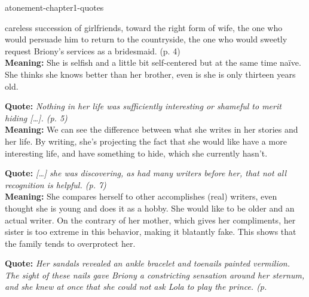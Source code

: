 \documentclass[preview]{standalone}
\begin{document}
\begin{snippet}{atonement-chapter1-quotes}
\begin{minipage}[r]{0.95\textwidth}
{        careless succession of girlfriends, toward the right form
        of wife, the one who would persuade him to return to the
        countryside, the one who would sweetly request Briony's
        services as a bridesmaid. (p. 4)
    }
    \\
    \textbf{Meaning:} She is selfish and a little bit self-centered but at the same time naïve.
    She thinks she knows better than her brother, even is she is only thirteen years old.
\end{minipage}
\hr
\begin{minipage}[l]{0.05\textwidth}
\end{minipage}
\begin{minipage}[r]{0.95\textwidth}
    \textbf{Quote:} \textit{
        Nothing in her life was sufficiently interesting or
        shameful to merit hiding […]. (p. 5)
    }
    \\
    \textbf{Meaning:} We can see the difference between what she writes in her stories and her life.
    By writing, she's projecting the fact that she would like have a more interesting life,
    and have something to hide, which she currently hasn't.
\end{minipage}
\hr
\begin{minipage}[l]{0.05\textwidth}
\end{minipage}
\begin{minipage}[r]{0.95\textwidth}
    \textbf{Quote:} \textit{
        […] she was discovering, as had many writers before her,
        that not all recognition is helpful. (p. 7)
    }
    \\
    \textbf{Meaning:} She compares herself to other accomplishes (real) writers, even thought she is
    young and does it as a hobby. She would like to be older and an actual writer.
    On the contrary of her mother, which gives her compliments, her sister is too extreme
    in this behavior, making it blatantly fake.
    This shows that the family tends to overprotect her.
\end{minipage}
\hr
\begin{minipage}[l]{0.05\textwidth}
\end{minipage}
\begin{minipage}[r]{0.95\textwidth}
    \textbf{Quote:} \textit{
        Her sandals revealed an ankle bracelet and toenails
        painted vermilion. The sight of these nails gave Briony a
        constricting sensation around her sternum, and she knew
        at once that she could not ask Lola to play the prince. (p.
}
\end{minipage}
\end{snippet}
\end{document}
